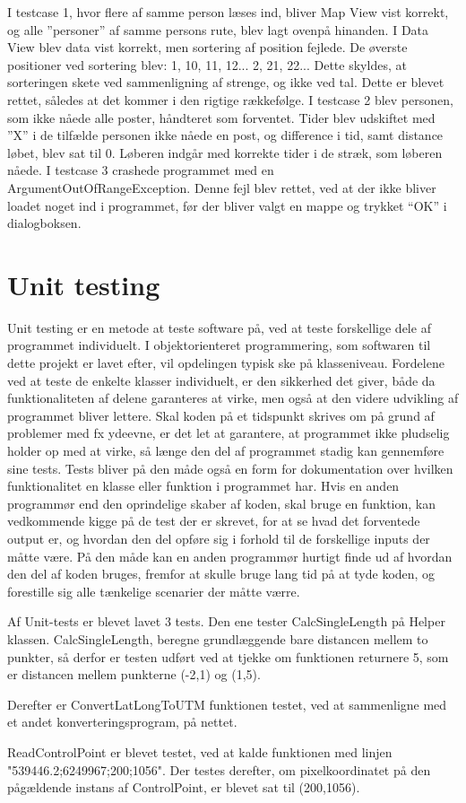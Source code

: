 I testcase 1, hvor flere af samme person læses ind, bliver Map View vist korrekt, og alle ”personer” af samme persons rute, blev lagt ovenpå hinanden. I Data View blev data vist korrekt, men sortering af position fejlede. De øverste positioner ved sortering blev: 1, 10, 11, 12... 2, 21, 22... Dette skyldes, at sorteringen skete ved sammenligning af strenge, og ikke ved tal. Dette er blevet rettet, således at det kommer i den rigtige rækkefølge.\newline
I testcase 2 blev personen, som ikke nåede alle poster, håndteret som forventet. Tider blev udskiftet med ”X” i de tilfælde personen ikke nåede en post, og difference i tid, samt distance løbet, blev sat til 0. Løberen indgår med korrekte tider i de stræk, som løberen nåede.\newline
I testcase 3 crashede programmet med en ArgumentOutOfRangeException. Denne fejl blev rettet, ved at der ikke bliver loadet noget ind i programmet, før der bliver valgt en mappe og trykket “OK” i dialogboksen.

\section{Unit testing}
Unit testing er en metode at teste software på, ved at teste forskellige dele af programmet individuelt. I objektorienteret programmering, som softwaren til dette projekt er lavet efter, vil opdelingen typisk ske på klasseniveau. Fordelene ved at teste de enkelte klasser individuelt, er den sikkerhed det giver, både da funktionaliteten af delene garanteres at virke, men også at den videre udvikling af programmet bliver lettere. Skal koden på et tidspunkt skrives om på grund af problemer med fx ydeevne, er det let at garantere, at programmet ikke pludselig holder op med at virke, så længe den del af programmet stadig kan gennemføre sine tests.
Tests bliver på den måde også en form for dokumentation over hvilken funktionalitet en klasse eller funktion i programmet har. Hvis en anden programmør end den oprindelige skaber af koden, skal bruge en funktion, kan vedkommende kigge på de test der er skrevet, for at se hvad det forventede output er, og hvordan den del opføre sig i forhold til de forskellige inputs der måtte være. På den måde kan en anden programmør hurtigt finde ud af hvordan den del af koden bruges, fremfor at skulle bruge lang tid på at tyde koden, og forestille sig alle tænkelige scenarier der måtte værre. 

Af Unit-tests er blevet lavet 3 tests. 
Den ene tester CalcSingleLength på Helper klassen. CalcSingleLength, beregne grundlæggende bare distancen mellem to punkter, så derfor er testen udført ved at tjekke om funktionen returnere 5, som er distancen mellem punkterne (-2,1) og (1,5).

Derefter er ConvertLatLongToUTM funktionen testet, ved at sammenligne med et andet konverteringsprogram, på nettet. \citep{LatLongConvert}  

ReadControlPoint er blevet testet, ved at kalde funktionen med linjen "539446.2;6249967;200;1056". Der testes derefter, om pixelkoordinatet på den pågældende instans af ControlPoint, er blevet sat til (200,1056).



